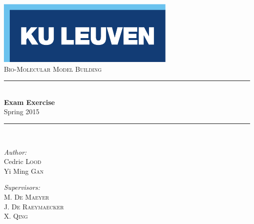 \begin{titlepage}
  \begin{center}
    
    \includegraphics[scale=1.5]{Figures/kuleuven_logo.pdf}~\\[4.5cm]
    
    \textsc{\Large Bio-Molecular Model Building}\\[0.5cm]
    
    \rule{\linewidth}{0.3mm}\\[0.4cm]
    {\huge \bfseries Exam Exercise} \\[0.4cm]
    {\large Spring 2015} \\[0.4cm]
    \rule{\linewidth}{0.3mm}\\[1.5cm]
    
    \begin{minipage}{0.4\textwidth}
      \begin{flushleft} \large
        \emph{Author:}\\
        Cedric \textsc{Lood}\\
        Yi Ming \textsc{Gan}\\
      \end{flushleft}
    \end{minipage}
    \begin{minipage}{0.4\textwidth}
      \begin{flushright} \large
        \emph{Supervisors:} \\
        M. \textsc{De Maeyer}\\
        J. \textsc{De Raeymaecker}\\
        X. \textsc{Qing}
      \end{flushright}
    \end{minipage}
    
    \vfill
    

\end{center}
\end{titlepage}
